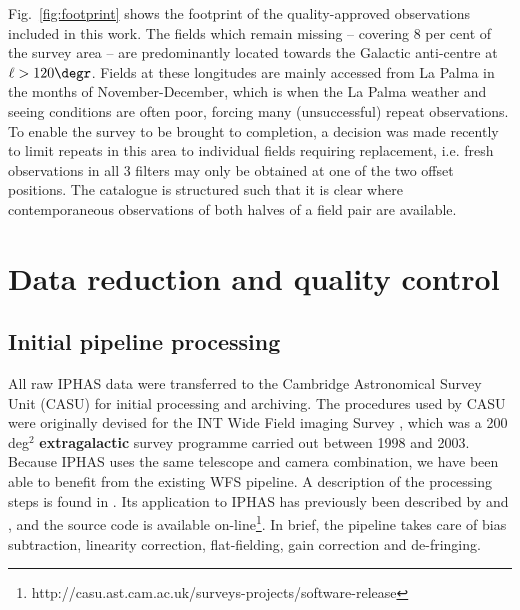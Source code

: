 \documentclass[a4paper,useAMS,usenatbib]{mn2e}
\begin{document}
Fig.~\ref{fig:footprint} shows the footprint
of the quality-approved observations included in this work. 
The fields which remain missing 
-- covering 8 per cent of the survey area --
are predominantly located towards the Galactic anti-centre 
at $\ell > 120\degr$.
Fields at these longitudes are mainly accessed from La Palma 
in the months of November-December,
which is when the La Palma weather and seeing conditions are often poor,
forcing many (unsuccessful) repeat observations.
To enable the survey to be brought to completion, 
a decision was made recently to limit repeats in this area 
to individual fields requiring replacement,
i.e. fresh observations in all 3 filters may only be obtained 
at one of the two offset positions.  
The catalogue is structured such that it is clear 
where contemporaneous observations of both halves of a field pair
are available.


\section{Data reduction and quality control}
\label{sec:reduction}

\subsection{Initial pipeline processing}

All raw IPHAS data were transferred
to the Cambridge Astronomical Survey Unit (CASU) 
for initial processing and archiving.
The procedures used by CASU were originally devised
for the INT Wide Field imaging Survey \citep[WFS;][]{McMahon2001,Irwin2005},
which was a 200 deg$^2$ {\bf extragalactic} survey programme carried out 
between 1998 and 2003.
Because IPHAS uses the same telescope and camera combination,
we have been able to benefit from the existing WFS pipeline.
A description of the processing steps 
is found in \citet{Irwin2001}.
Its application to IPHAS has previously been described
by \citet{Drew2005} and \citet{Gonzalez-Solares2008},
and the source code is available
on-line\footnote{http://casu.ast.cam.ac.uk/surveys-projects/software-release}. 
In brief, the pipeline takes care of bias subtraction,
linearity correction, flat-fielding,
gain correction and de-fringing.
\end{document}
